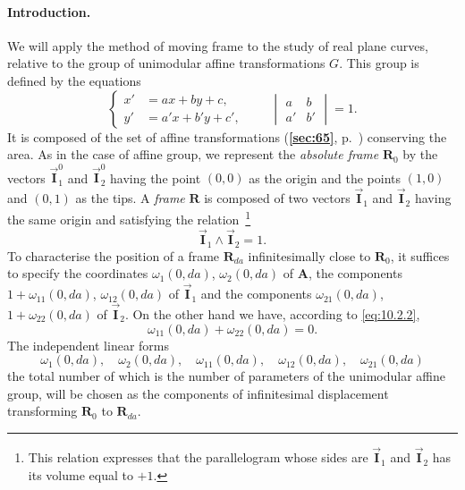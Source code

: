 \documentclass[leqno,11pt]{book}
\numberwithin{equation}{chapter}
\theoremstyle{shape1}
\theoremstyle{shapesmall}
\newcommand{\fsref}[1]{{\rm\textsection\textbf{\ref{sec:#1}}}}
\newcommand{\rvec}[1]{\vec{\mathbf{#1}}}
\newcommand{\ivec}{\rvec{I}}
\begin{document}
\paragraph{Introduction.}
\label{sec:133}
We will apply the method of moving frame to the study of real plane curves, relative to the group of unimodular affine transformations $G$. This group is defined by the equations
\setcounter{equation}{0}
\begin{equation}
  \label{eq:10.2.1}
  \left\{
    \begin{aligned}
      x'&=ax+by+c,\\
      y'&=a'x+b'y+c',
    \end{aligned}
  \right.
  \qquad
  \begin{vmatrix}
    a&b\\
    a'&b'
  \end{vmatrix}
  =1.
\end{equation}
It is composed of the set of affine transformations (\fsref{65}, p.~\pageref{sec:65}) conserving the area. As in the case of affine group, we represent the \emph{absolute frame} $\mathbf{R}_{0}$ by the vectors $\ivec^{0}_{1}$ and $\ivec^{0}_{2}$ having the point $(0,0)$ as the origin and the points $(1,0)$ and $(0,1)$ as the tips. A \emph{frame} $\mathbf{R}$ is composed of two vectors $\ivec_{1}$ and $\ivec_{2}$ having the same origin and satisfying the relation~\footnote{This relation expresses that the parallelogram whose sides are $\ivec_{1}$ and $\ivec_{2}$ has its volume equal to $+1$.}
\begin{equation}
  \label{eq:10.2.2}
  \ivec_{1}\wedge\ivec_{2}=1.
\end{equation}
To characterise the position of a frame $\mathbf{R}_{da}$ infinitesimally close to $\mathbf{R}_{0}$, it suffices to specify the coordinates $\omega_{1}(0,da)$, $\omega_{2}(0,da)$ of $\mathbf{A}$, the components $1+\omega_{11}(0,da)$, $\omega_{12}(0,da)$ of $\ivec_{1}$ and the components $\omega_{21}(0,da)$, $1+\omega_{22}(0,da)$ of $\ivec_{2}$. On the other hand we have, according to \eqref{eq:10.2.2},
\[
\omega_{11}(0,da)+\omega_{22}(0,da)=0.
\]
The independent linear forms
\[
\omega_{1}(0,da),\quad\omega_{2}(0,da),\quad\omega_{11}(0,da),\quad\omega_{12}(0,da),\quad\omega_{21}(0,da)
\]
the total number of which is the number of parameters of the unimodular affine group, will be chosen as the components of infinitesimal displacement transforming $\mathbf{R}_{0}$ to $\mathbf{R}_{da}$.
\end{document}
